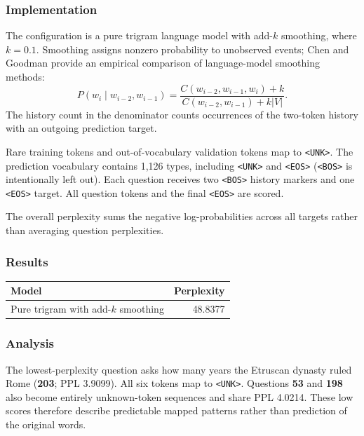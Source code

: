 \documentclass[11pt]{article}
\begin{document}
\subsubsection*{Implementation}

\noindent
The configuration is a pure trigram language model with add-$k$ smoothing, where $k=0.1$. Smoothing assigns nonzero probability to unobserved events; Chen and Goodman \cite{chen1996smoothing} provide an empirical comparison of language-model smoothing methods:
\[
P \left(
        w_{i} \mid w_{i-2}, w_{i-1}
    \right) = \frac{
        C \left(
            w_{i-2}, w_{i-1}, w_{i}
        \right) + k
    }{
        C \left(
            w_{i-2}, w_{i-1}
        \right) + k \vert V \vert
    }.
\]
The history count in the denominator counts occurrences of the two-token history with an outgoing prediction target.

\noindent
Rare training tokens and out-of-vocabulary validation tokens map to \texttt{<UNK>}. The prediction vocabulary contains 1,126 types, including \texttt{<UNK>} and \texttt{<EOS>} (\texttt{<BOS>} is intentionally left out). Each question receives two \texttt{<BOS>} history markers and one \texttt{<EOS>} target.  All question tokens and the final \texttt{<EOS>} are scored.

\noindent
The overall perplexity sums the negative log-probabilities across all targets rather than averaging question perplexities.

\subsubsection*{Results}

\begin{table}[!h]
    \centering
    \small
    \begin{tabular}{lr}
        \toprule
        Model & Perplexity \\
        \midrule    
        Pure trigram with add-$k$ smoothing & 48.8377 \\
        \bottomrule
    \end{tabular}
    \label{table:week_38_pure_trigram_perplexity}
\end{table}

\subsubsection*{Analysis}

\noindent
The lowest-perplexity question asks how many years the Etruscan dynasty ruled Rome (\textbf{203}; PPL 3.9099). All six tokens map to \texttt{<UNK>}. Questions \textbf{53} and \textbf{198} also become entirely unknown-token sequences and share PPL 4.0214. These low scores therefore describe predictable mapped patterns rather than prediction of the original words.
\end{document}
